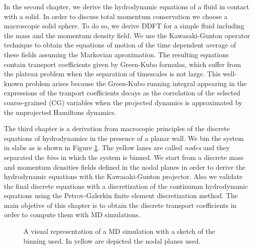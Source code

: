 \documentclass[b5paper,openright,10pt]{book}
\begin{document}
In the second chapter, we derive the hydrodynamic equations of a fluid in contact with a solid. In order to discuss total momentum conservation we choose a macroscopic solid sphere. 
To do so, we derive DDFT for a simple fluid including the mass and the momentum density field.
We use the Kawasaki-Gunton operator technique to obtain the equations of motion of the time dependent average of these fields assuming the Markovian aproximation. 
The resulting equations contain transport coefficients given by  Green-Kubo formulas, which suffer from the plateau problem when the separation of timescales is not large.  
This well-known problem arises because the Green-Kubo running integral appearing in the expressions of the tranport coefficients decays as the correlation of the selected coarse-grained (CG) variables when the projected dynamics is approximated by the unprojected Hamiltons dynamics. 

The third chapter is a derivation from macrocopic principles of the discrete equations of hydrodynamics in the presence of a planar wall. 
We bin the system in slabs as is shown in Figure \ref{fig:WallsBox1}. The yellow lanes are called {\it nodes} and they separated the {\it bins} in which the system is binned. We start from a discrete mass and momentum densities fields defined in the nodal planes in order to derive the hydrodynamic equations with the Kawasaki-Gunton projector. Also we validate the final discrete equations  with a discretization of the continumm hydrodynamic equations using the Petrov-Galerkin finite element discretization method.   
The main objetive of this chapter is to obtain the discrete transport coefficients in order to compute them with MD simulations. 
\begin{figure}
    \centering
    \caption[Visual representation of a MD simulation with a sketch of the binning used]{A visual representation of a MD simulation with a sketch of the binning used. In yellow are depicted the nodal planes used.}
    \label{fig:WallsBox1}
\end{figure}
\end{document}
